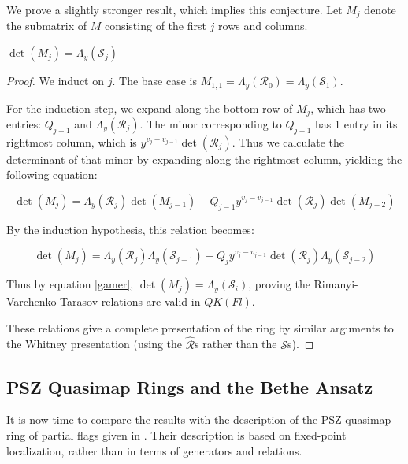 \documentclass[11pt,letterpaper]{amsart}
\begin{document}
We prove a slightly stronger result, which implies this conjecture. 
Let $M_{j}$ denote the submatrix of $M$ consisting of the first $j$ rows and columns.

\begin{thm}
    $\det(M_j)=\Lambda_y(\mathcal{S}_j)$
\end{thm}


\begin{proof}
We induct on $j$. The base case is $M_{1,1}=\Lambda_y(\mathcal{R}_0)=\Lambda_y(\mathcal{S}_1)$. 

For the induction step, we expand along the bottom row of $M_j$, which has two entries: $Q_{j-1}$ and $\Lambda_y(\mathcal{R}_j)$. The minor corresponding to $Q_{j-1}$ has 1 entry in its rightmost column, which is $y^{v_{j}-v_{j-1}}\det(\mathcal{R}_j)$. Thus we calculate the determinant of that minor by expanding along the rightmost column, yielding the following equation:

\begin{equation} 
\det(M_j)=\Lambda_y(\mathcal{R}_j)\det(M_{j-1})-Q_{j-1}y^{v_{j}-v_{j-1}}\det(\mathcal{R}_j)\det(M_{j-2})
\end{equation}

By the induction hypothesis, this relation becomes: 


\begin{equation} 
\det(M_j)=\Lambda_y(\mathcal{R}_j)\Lambda_y(\mathcal{S}_{j-1})-Q_{j}y^{v_{j}-v_{j-1}}\det(\mathcal{R}_j)\Lambda_y(\mathcal{S}_{j-2})
\end{equation}


Thus by equation \eqref{gamer}, $\det(M_j)=\Lambda_y(\mathcal{S}_i)$, proving the Rimanyi-Varchenko-Tarasov relations are valid in $QK(Fl)$. 



These relations give a complete presentation of the ring by similar arguments to the Whitney presentation (using the $\widehat{\mathcal{R}}$s rather than the $\mathcal{S}$s). 
\end{proof}  


\subsection{PSZ Quasimap Rings and the Bethe Ansatz}

It is now time to compare the results with the description of the PSZ quasimap ring of partial flags given in \cite{manybody}. Their description is based on fixed-point localization, rather than in terms of generators and relations. 
\end{document}
